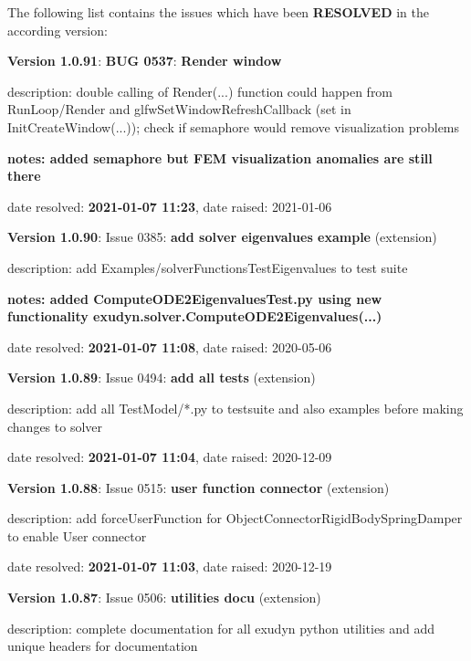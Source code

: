 \par \noindent The following list contains the issues which have been {\bf RESOLVED} in the according version:
\bi
  \item {\bf Version 1.0.91}: \vspace{-6pt} 
{\bf \color{warningRed}  BUG 0537}: {\bf Render window}
  \bi
  \item {\small description: double calling of Render(...) function could happen from RunLoop/Render and glfwSetWindowRefreshCallback (set in InitCreateWindow(...)); check if semaphore would remove visualization problems}
  \item {\small \bf notes: added semaphore but FEM visualization anomalies are still there}
  \item   date resolved: {\bf 2021-01-07 11:23},
date raised: 2021-01-06   \ei
  \item {\bf Version 1.0.90}: \vspace{-6pt} 
  Issue 0385: {\bf add solver eigenvalues example}
(extension)
  \bi
  \item {\small description: add Examples/solverFunctionsTestEigenvalues  to test suite}
  \item {\small \bf notes: added ComputeODE2EigenvaluesTest.py using new functionality exudyn.solver.ComputeODE2Eigenvalues(...)}
  \item   date resolved: {\bf 2021-01-07 11:08},
date raised: 2020-05-06   \ei
  \item {\bf Version 1.0.89}: \vspace{-6pt} 
  Issue 0494: {\bf add all tests}
(extension)
  \bi
  \item {\small description: add all TestModel/*.py to testsuite and also examples before making changes to solver}
  \item   date resolved: {\bf 2021-01-07 11:04},
date raised: 2020-12-09   \ei
  \item {\bf Version 1.0.88}: \vspace{-6pt} 
  Issue 0515: {\bf user function connector}
(extension)
  \bi
  \item {\small description: add forceUserFunction for ObjectConnectorRigidBodySpringDamper to enable User connector}
  \item   date resolved: {\bf 2021-01-07 11:03},
date raised: 2020-12-19   \ei
  \item {\bf Version 1.0.87}: \vspace{-6pt} 
  Issue 0506: {\bf utilities docu}
(extension)
  \bi
  \item {\small description: complete documentation for all exudyn python utilities and add unique headers for documentation}
